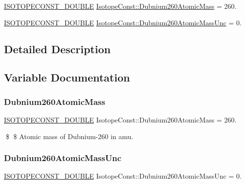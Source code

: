 \begin{DoxyCompactItemize}
\item 
\mbox{\hyperlink{group___isotope_const-_macros_ga8f45a7272ce02c0b4c65c44636ed719a}{I\+S\+O\+T\+O\+P\+E\+C\+O\+N\+S\+T\+\_\+\+D\+O\+U\+B\+LE}} \mbox{\hyperlink{group___isotope_const-_dubnium-_db260_gae38907b8e7b3eeb0740d3bc8527fbf67}{Isotope\+Const\+::\+Dubnium260\+Atomic\+Mass}} = 260.
\item 
\mbox{\hyperlink{group___isotope_const-_macros_ga8f45a7272ce02c0b4c65c44636ed719a}{I\+S\+O\+T\+O\+P\+E\+C\+O\+N\+S\+T\+\_\+\+D\+O\+U\+B\+LE}} \mbox{\hyperlink{group___isotope_const-_dubnium-_db260_ga83e0a1e87a2b01cd8503459e9ac6f597}{Isotope\+Const\+::\+Dubnium260\+Atomic\+Mass\+Unc}} = 0.
\end{DoxyCompactItemize}


\subsection{Detailed Description}


\subsection{Variable Documentation}
\mbox{\label{group___isotope_const-_dubnium-_db260_gae38907b8e7b3eeb0740d3bc8527fbf67}} 
\subsubsection{\texorpdfstring{Dubnium260\+Atomic\+Mass}{Dubnium260AtomicMass}}
{\footnotesize\ttfamily \mbox{\hyperlink{group___isotope_const-_macros_ga8f45a7272ce02c0b4c65c44636ed719a}{I\+S\+O\+T\+O\+P\+E\+C\+O\+N\+S\+T\+\_\+\+D\+O\+U\+B\+LE}} Isotope\+Const\+::\+Dubnium260\+Atomic\+Mass = 260.}

\$ \$ Atomic mass of Dubnium-\/260 in amu. \mbox{\label{group___isotope_const-_dubnium-_db260_ga83e0a1e87a2b01cd8503459e9ac6f597}} 
\subsubsection{\texorpdfstring{Dubnium260\+Atomic\+Mass\+Unc}{Dubnium260AtomicMassUnc}}
{\footnotesize\ttfamily \mbox{\hyperlink{group___isotope_const-_macros_ga8f45a7272ce02c0b4c65c44636ed719a}{I\+S\+O\+T\+O\+P\+E\+C\+O\+N\+S\+T\+\_\+\+D\+O\+U\+B\+LE}} Isotope\+Const\+::\+Dubnium260\+Atomic\+Mass\+Unc = 0.}

